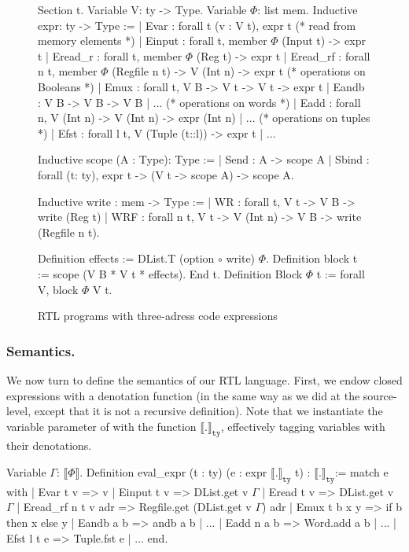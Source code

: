 \documentclass{llncs}
\newcommand{\denote}[1]{\llbracket #1 \rrbracket}
\newcommand{\denotety}[1]{\denote{\mathtt{#1}}_{\mathtt{ty}}}
\begin{document}
\begin{figure}
  \centering
\begin{coq}
Section t. 
Variable V: ty -> Type. Variable $\Phi$: list mem. 
Inductive expr: ty -> Type :=
| Evar : forall t (v : V t), expr t
(* read from memory elements *)
| Einput : forall t, member $\Phi$ (Input t) -> expr t
| Eread_r : forall t, member $\Phi$ (Reg t) -> expr t
| Eread_rf : forall n t, member $\Phi$ (Regfile n t) -> V (Int n) -> expr t
(* operations on Booleans *)
| Emux : forall t, V B -> V t -> V t -> expr t
| Eandb : V B -> V B -> V B | ... 
(* operations on words *)
| Eadd : forall n, V (Int n) -> V (Int n) -> expr (Int n) | ... 
(* operations on tuples *)
| Efst : forall l t, V (Tuple (t::l)) -> expr t | ...

Inductive scope (A : Type): Type :=
| Send : A -> scope A
| Sbind : forall (t: ty), expr t -> (V t -> scope A) -> scope A. 

Inductive write : mem -> Type :=
| WR : forall t, V t -> V B -> write (Reg t)
| WRF : forall n t, V t -> V (Int n) -> V B ->  write (Regfile n t). 
     
Definition effects := DList.T (option $\circ$ write) $\Phi$. 
Definition block t := scope (V B * V t *  effects).         
End t.
Definition Block $\Phi$ t := forall V, block $\Phi$ V t.
\end{coq}
  \caption{RTL programs with three-adress code expressions}
  \label{fig:rtl}
\end{figure}

\subsubsection{Semantics.} We now turn to define the semantics of our RTL
language. 
%
First, we endow closed expressions with a denotation function (in the
same way as we did at the source-level, except that it is not a
recursive definition).
%
Note that we instantiate the variable parameter of  with
the function $\denotety{.}$, effectively tagging variables with their
denotations.

\begin{mcoq}
Variable $\Gamma$: $\denote{\Phi}$. 
Definition eval_expr (t : ty) (e : expr $\denotety{.}$ t) : $\denotety{.}$:=
match e with
| Evar t v => v
| Einput t v => DList.get v $\Gamma$
| Eread  t v =>  DList.get v $\Gamma$
| Eread_rf n t v adr => Regfile.get (DList.get v $\Gamma$) adr
| Emux t b x y => if b then x else y 
| Eandb a b => andb a b | ...
| Eadd n a b => Word.add a b  | ...
| Efst l t e => Tuple.fst e | ...
end. 
\end{mcoq}
\end{document}
